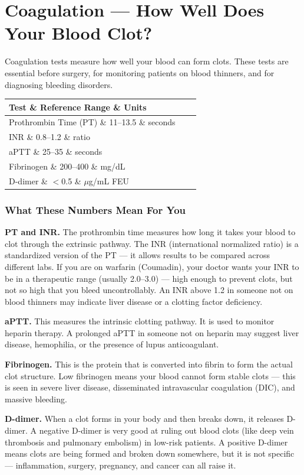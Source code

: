 \clearpage
\section{Coagulation --- How Well Does Your Blood Clot?}

Coagulation tests measure how well your blood can form clots. These tests are essential before surgery, for monitoring patients on blood thinners, and for diagnosing bleeding disorders.

\begin{longtable}{@{}lll@{}}
\toprule
\textbf{Test} \& \textbf{Reference Range} \& \textbf{Units} \\
\midrule
Prothrombin Time (PT) \& 11--13.5 \& seconds \\
INR \& 0.8--1.2 \& ratio \\
aPTT \& 25--35 \& seconds \\
Fibrinogen \& 200--400 \& mg/dL \\
D-dimer \& $<$0.5 \& $\mu$g/mL FEU \\
\bottomrule
\end{longtable}

\subsubsection{What These Numbers Mean For You}

\textbf{PT and INR.} The prothrombin time measures how long it takes your blood to clot through the extrinsic pathway. The INR (international normalized ratio) is a standardized version of the PT --- it allows results to be compared across different labs. If you are on warfarin (Coumadin), your doctor wants your INR to be in a therapeutic range (usually 2.0--3.0) --- high enough to prevent clots, but not so high that you bleed uncontrollably. An INR above 1.2 in someone not on blood thinners may indicate liver disease or a clotting factor deficiency.

\textbf{aPTT.} This measures the intrinsic clotting pathway. It is used to monitor heparin therapy. A prolonged aPTT in someone not on heparin may suggest liver disease, hemophilia, or the presence of lupus anticoagulant.

\textbf{Fibrinogen.} This is the protein that is converted into fibrin to form the actual clot structure. Low fibrinogen means your blood cannot form stable clots --- this is seen in severe liver disease, disseminated intravascular coagulation (DIC), and massive bleeding.

\textbf{D-dimer.} When a clot forms in your body and then breaks down, it releases D-dimer. A negative D-dimer is very good at ruling out blood clots (like deep vein thrombosis and pulmonary embolism) in low-risk patients. A positive D-dimer means clots are being formed and broken down somewhere, but it is not specific --- inflammation, surgery, pregnancy, and cancer can all raise it.

